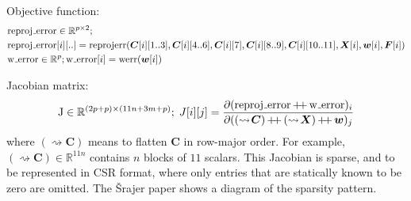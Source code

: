 \documentclass[11pt]{article}
\newcommand\R{\mathbb R}
\newcommand\append{\mathop{+\mkern-4mu+}}
\newcommand\flatten[1]{{(\rightsquigarrow\!#1)}}
\begin{document}
Objective function:
\begin{align*}
&\mathrm{reproj\mathunderscore{}error} \in \R^{p \times 2} ; \\
&\mathrm{reproj\mathunderscore{}error}[i][..] = \mathrm{reprojerr}(\bm{C}[i][1..3], \bm{C}[i][4..6], \bm{C}[i][7], \bm{C}[i][8..9], \bm{C}[i][10..11], \bm{X}[i], \bm{w}[i], \bm{F}[i]) \\
&\mathrm{w\mathunderscore{}error} \in \R^p ;
\mathrm{w\mathunderscore{}error}[i] = \mathrm{werr}(\bm{w}[i])
\end{align*}

Jacobian matrix:
\begin{align*}
\mathrm{J} \in \R^{(2p + p) \times (11n + 3m + p)} ;\;
J[i][j] = \frac{\partial (\mathrm{reproj\mathunderscore{}error} \append \mathrm{w\mathunderscore{}error})_i}{\partial (\flatten{\bm{C}} \append \flatten{\bm{X}} \append \bm{w})_j}
\end{align*}
where $\flatten{\bm{C}}$ means to flatten $\bm{C}$ in row-major order.
For example, $\flatten{\bm{C}} \in \R^{11n}$ contains $n$ blocks of $11$ scalars.
This Jacobian is sparse, and to be represented in CSR format, where only entries that are statically known to be zero are omitted.
The \v{S}rajer paper shows a diagram of the sparsity pattern.
\end{document}
